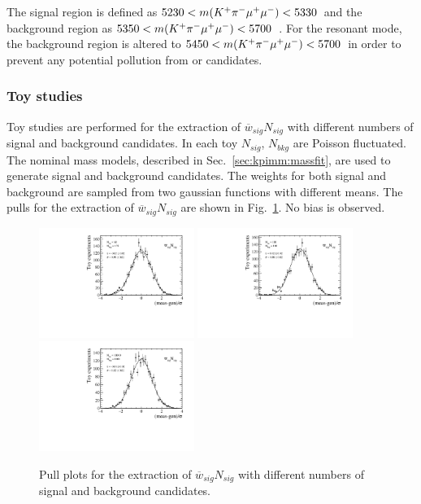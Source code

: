 The signal region is defined as $5230<m({{K}^+}{{\pi}^-}{\mu^+}{\mu^-})<5330$~\mevcc and the background region as $5350<m({{K}^+}{{\pi}^-}{\mu^+}{\mu^-})<5700$~\mevcc. For the resonant mode, the background region is altered to $5450<m({{K}^+}{{\pi}^-}{\mu^+}{\mu^-})<5700$~\mevcc in order to prevent any potential pollution from \BdToJPsiKst or \BsToJPsiKst candidates.

\subsubsection{Toy studies}

Toy studies are performed for the extraction of $\overline{w}_{sig}N_{sig}$ with different numbers of signal and background candidates.  In each toy $N_{sig}$, $N_{bkg}$ are Poisson fluctuated.  The nominal mass models, described in Sec.~\ref{sec:kpimm:massfit}, are used to generate signal and background candidates. The weights for both signal and background are sampled from two gaussian functions with different means.  The pulls for the extraction of $\overline{w}_{sig}N_{sig}$ are shown in Fig.~\ref{fig:bf:pulls}. No bias is observed.
 
\begin{figure}[!tb]
 \centering
 \includegraphics[width=0.45\textwidth]{figs/kpimm/bf/n_prime_low_yield.pdf}
 \includegraphics[width=0.45\textwidth]{figs/kpimm/bf/n_prime_med_yield.pdf}
 \includegraphics[width=0.45\textwidth]{figs/kpimm/bf/n_prime_high_yield.pdf}
 \caption{Pull plots for the extraction of $\overline{w}_{sig}N_{sig}$ with different numbers of signal and background candidates.}
 \label{fig:bf:pulls}
\end{figure}

